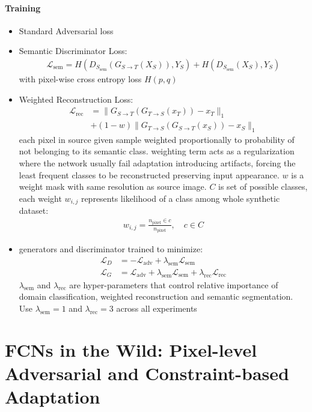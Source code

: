 \documentclass[]{article}
\begin{document}
\paragraph{Training}
\begin{itemize}
	\item Standard Adversarial loss
	\item Semantic Discriminator Loss:
	\begin{align}
		\mathcal{L}_{\text{sem}}= H(D_{S_{\text{sem}}}(G_{S\rightarrow T}(X_S)), Y_S) + H(D_{S_{\text{sem}}}(X_S), Y_S)
	\end{align}
	with pixel-wise cross entropy loss $H(p,q)$
	\item Weighted Reconstruction Loss:
	\begin{align}
		\mathcal{L}_{\text{rec}} &= \lVert G_{S\rightarrow T}(G_{T\rightarrow S}(x_T))- x_T\rVert_1 \\
		&+ (1-w) \lVert G_{T\rightarrow S} (G_{S\rightarrow T}(x_S)) - x_S \rVert_1
	\end{align}
	each pixel in source given sample weighted proportionally to probability of not belonging to its semantic class. weighting term acts as a regularization where the network usually fail adaptation introducing artifacts, forcing the least frequent classes to be reconstructed preserving input appearance.
	$w$ is a weight mask with same resolution as source image. $C$ is set of possible classes, each weight $w_{i,j}$ represents likelihood of a class among whole synthetic dataset:
	\begin{align}
		w_{i,j} = \frac{n_{\text{pixel}}\in c}{n_{\text{pixel}}}, \quad c \in C
	\end{align}
	\item generators and discriminator  trained to minimize:
	\begin{align}
		\mathcal{L}_D &= - \mathcal{L}_{\text{adv}} + \lambda_{\text{sem}}\mathcal{L}_{\text{sem}}\\
		\mathcal{L}_G &= \mathcal{L}_{\text{adv}} + \lambda_{\text{sem}}\mathcal{L}_{\text{sem}} + \lambda_{\text{rec}} \mathcal{L}_{\text{rec}}
	\end{align}
	$\lambda_{\text{sem}}$ and $\lambda_{\text{rec}}$ are hyper-parameters that control relative importance of domain classification, weighted reconstruction and semantic segmentation. Use $\lambda_{\text{sem}} = 1$ and $\lambda_{\text{rec}} = 3$ across all experiments
\end{itemize}

\section{FCNs in the Wild: Pixel-level Adversarial and Constraint-based Adaptation}
\end{document}
